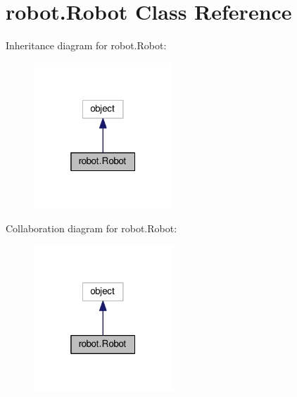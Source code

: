 \hypertarget{classrobot_1_1Robot}{}\section{robot.\+Robot Class Reference}
\label{classrobot_1_1Robot}


Inheritance diagram for robot.\+Robot\+:\nopagebreak
\begin{figure}[H]
\begin{center}
\leavevmode
\includegraphics[width=148pt]{classrobot_1_1Robot__inherit__graph}
\end{center}
\end{figure}


Collaboration diagram for robot.\+Robot\+:\nopagebreak
\begin{figure}[H]
\begin{center}
\leavevmode
\includegraphics[width=148pt]{classrobot_1_1Robot__coll__graph}
\end{center}
\end{figure}
